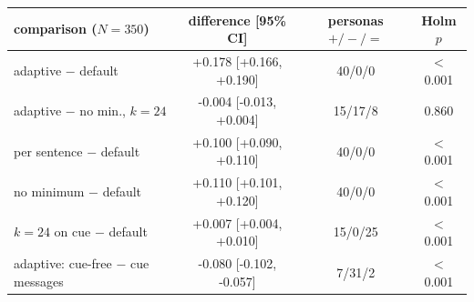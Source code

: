 \begin{tabular}{lccc}
\toprule
comparison ($N=350$) & difference [95\% CI] & personas $+/-/=$ & Holm $p$ \\
\midrule
adaptive $-$ default & +0.178 [+0.166, +0.190] & 40/0/0 & \ensuremath{<}0.001 \\
adaptive $-$ no min., $k{=}24$ & -0.004 [-0.013, +0.004] & 15/17/8 & 0.860 \\
per sentence $-$ default & +0.100 [+0.090, +0.110] & 40/0/0 & \ensuremath{<}0.001 \\
no minimum $-$ default & +0.110 [+0.101, +0.120] & 40/0/0 & \ensuremath{<}0.001 \\
$k{=}24$ on cue $-$ default & +0.007 [+0.004, +0.010] & 15/0/25 & \ensuremath{<}0.001 \\
adaptive: cue-free $-$ cue messages & -0.080 [-0.102, -0.057] & 7/31/2 & \ensuremath{<}0.001 \\
\bottomrule
\end{tabular}
